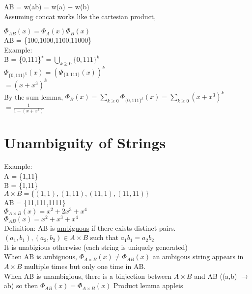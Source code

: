 \documentclass[12pt]{article}
\begin{document}
	AB = w(ab) = w(a) + w(b)\\
	
	Assuming concat works like the cartesian product,
	
	$\Phi_{AB}(x) = \Phi_A(x)\Phi_B(x)$\\
	
	AB = \{100,1000,1100,11000\}\\
	
	Example:\\
	
	B = \{0,111\}$^* = \bigcup_{k \geq 0}\{0,111\}^k$\\
	$\Phi_{\{0,111\}^k}(x) = (\Phi_{\{0,111\}}(x))^k$\\
	$ = (x + x^3)^k$\\
	
	By the sum lemma, $\Phi_B(x) = \sum_{k \geq 0}\Phi_{\{0,111\}^k}(x) = \sum_{k \geq 0}(x+x^3)^k$\\
	$ = \frac{1}{1-(x+x^3)}$\\
	
	\section*{Unambiguity of Strings}
	
	Example:\\
	A = \{1,11\}\\
	B = \{1,11\}\\
	
	$A \times B = \{(1,1), (1,11), (11, 1), (11,11)\}$\\
	AB = \{11,111,1111\}\\
	
	$\Phi_{A \times B}(x) = x^2 + 2x^3 + x^4$\\
	$\Phi_{AB}(x) = x^2 + x^3 + x^4$\\
	
	Definition: AB is \underline{ambiguous} if there exists distinct pairs. $(a_1, b_1), (a_2, b_2) \in A \times B$ such that $a_1b_1 = a_2b_2$\\
	
	It is unabigious otherwise (each string is uniquely generated)\\
	
	When AB is ambiguous, $\Phi_{A\times B}(x) \neq \Phi_{AB}(x)$ an ambigous string appears in $A \times B$ multiple times but only one time in AB.\\
	
	When AB is unambigious, there is a binjection between $A \times B$ and AB ((a,b) $\rightarrow$ ab) so then $\Phi_{AB}(x) = \Phi_{A\times B}(x)$ Product lemma appleis
	
	
	
	
	
	
\end{document}
